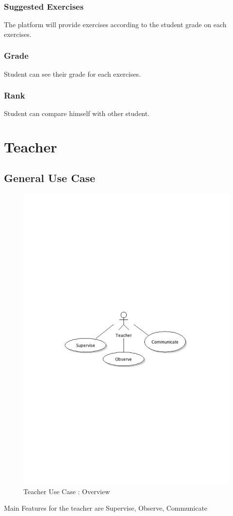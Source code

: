 		\subsubsection{Suggested Exercises}
			The platform will provide exercises according to the student grade on each exercises.
		\subsubsection{Grade}
			Student can see their grade for each exercises.
		\subsubsection{Rank}
			Student can compare himself with other student.
\newpage
\section{Teacher}
	\subsection{General Use Case}
		\begin{figure}[ht]
			\begin{center}
				\includegraphics[width=\textwidth,  trim=2cm 10cm 2cm 11cm]{UML_figure/UC/teacher/UC_Teacher_General.pdf}
				\caption{Teacher Use Case : Overview}
			\end{center}
		\end{figure}
		Main Features for the teacher are Supervise, Observe, Communicate
